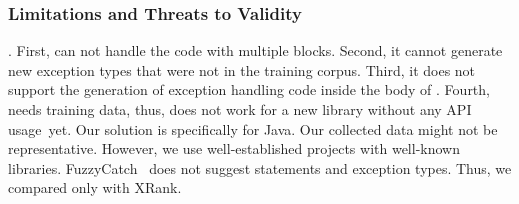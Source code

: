 
\subsubsection*{\bf Limitations and Threats to Validity}.
First, {\tool} can not handle the code with multiple 
blocks. Second, it cannot generate new exception types that were not
in the training corpus. Third, it does not support the generation of
exception handling code inside the body of . Fourth,
{\tool} needs training data, thus, does not work for a new library
without any API usage~yet. Our solution is specifically for Java. Our
collected data might not be representative. However, we use
well-established projects with well-known
libraries. FuzzyCatch~\cite{xrank-fse20} does not suggest statements
and exception types. Thus, we compared only with XRank.
